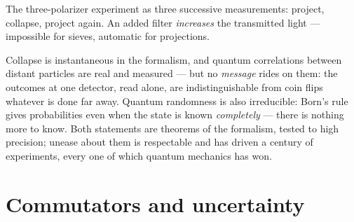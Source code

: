 \begin{omfigure}

{\small The three-polarizer experiment as three successive
measurements: project, collapse, project again. An added filter
\emph{increases} the transmitted light --- impossible for sieves,
automatic for projections.}
\end{omfigure}

\begin{remark}\label{rem:b3:quantum-formalism:nosignal}
Collapse is instantaneous in the formalism, and quantum correlations
between distant particles are real and measured --- but no
\emph{message} rides on them: the outcomes at one detector, read
alone, are indistinguishable from coin flips whatever is done far
away. Quantum randomness is also irreducible: Born's rule gives
probabilities even when the state is known \emph{completely} ---
there is nothing more to know. Both statements are theorems of the
formalism, tested to high precision; unease about them is
respectable and has driven a century of experiments, every one of
which quantum mechanics has won.
\end{remark}

\section{Commutators and uncertainty}

